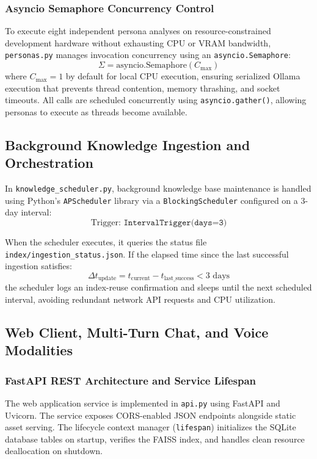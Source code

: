 \subsubsection{Asyncio Semaphore Concurrency Control}
To execute eight independent persona analyses on resource-constrained development hardware without exhausting CPU or VRAM bandwidth, \texttt{personas.py} manages invocation concurrency using an \texttt{asyncio.Semaphore}:
\begin{equation}
\Sigma = \text{asyncio.Semaphore}(C_{\text{max}})
\end{equation}
where $C_{\text{max}} = 1$ by default for local CPU execution, ensuring serialized Ollama execution that prevents thread contention, memory thrashing, and socket timeouts. All calls are scheduled concurrently using \texttt{asyncio.gather()}, allowing personas to execute as threads become available.

\subsection{Background Knowledge Ingestion and Orchestration}
\label{subsec:scheduler_orchestration}
In \texttt{knowledge\_scheduler.py}, background knowledge base maintenance is handled using Python's \texttt{APScheduler} library via a \texttt{BlockingScheduler} configured on a 3-day interval:
\begin{equation}
\text{Trigger: } \texttt{IntervalTrigger(days=3)}
\end{equation}

When the scheduler executes, it queries the status file \texttt{index/ingestion\_status.json}. If the elapsed time since the last successful ingestion satisfies:
\begin{equation}
\Delta t_{\text{update}} = t_{\text{current}} - t_{\text{last\_success}} < 3\text{ days}
\end{equation}
the scheduler logs an index-reuse confirmation and sleeps until the next scheduled interval, avoiding redundant network API requests and CPU utilization.

\subsection{Web Client, Multi-Turn Chat, and Voice Modalities}
\label{subsec:web_interface}

\subsubsection{FastAPI REST Architecture and Service Lifespan}
The web application service is implemented in \texttt{api.py} using FastAPI and Uvicorn. The service exposes CORS-enabled JSON endpoints alongside static asset serving. The lifecycle context manager (\texttt{lifespan}) initializes the SQLite database tables on startup, verifies the FAISS index, and handles clean resource deallocation on shutdown.

